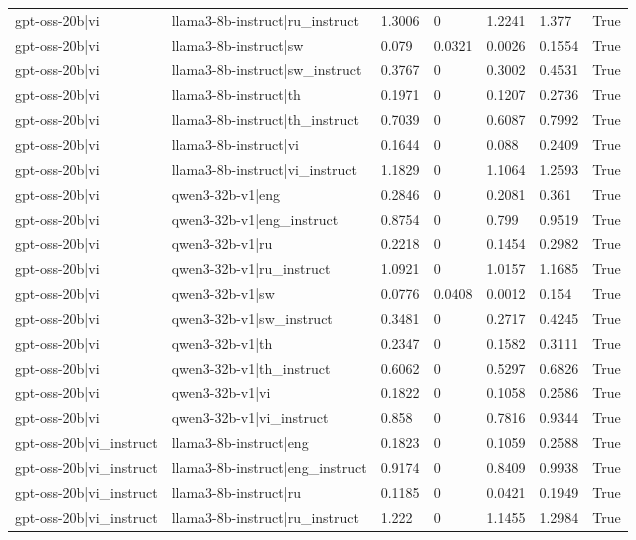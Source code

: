 \begin{table}
\begin{tabular}{llllllr}
gpt-oss-20b|vi & llama3-8b-instruct|ru_instruct & 1.3006 & 0 & 1.2241 & 1.377 & True \\
gpt-oss-20b|vi & llama3-8b-instruct|sw & 0.079 & 0.0321 & 0.0026 & 0.1554 & True \\
gpt-oss-20b|vi & llama3-8b-instruct|sw_instruct & 0.3767 & 0 & 0.3002 & 0.4531 & True \\
gpt-oss-20b|vi & llama3-8b-instruct|th & 0.1971 & 0 & 0.1207 & 0.2736 & True \\
gpt-oss-20b|vi & llama3-8b-instruct|th_instruct & 0.7039 & 0 & 0.6087 & 0.7992 & True \\
gpt-oss-20b|vi & llama3-8b-instruct|vi & 0.1644 & 0 & 0.088 & 0.2409 & True \\
gpt-oss-20b|vi & llama3-8b-instruct|vi_instruct & 1.1829 & 0 & 1.1064 & 1.2593 & True \\
gpt-oss-20b|vi & qwen3-32b-v1|eng & 0.2846 & 0 & 0.2081 & 0.361 & True \\
gpt-oss-20b|vi & qwen3-32b-v1|eng_instruct & 0.8754 & 0 & 0.799 & 0.9519 & True \\
gpt-oss-20b|vi & qwen3-32b-v1|ru & 0.2218 & 0 & 0.1454 & 0.2982 & True \\
gpt-oss-20b|vi & qwen3-32b-v1|ru_instruct & 1.0921 & 0 & 1.0157 & 1.1685 & True \\
gpt-oss-20b|vi & qwen3-32b-v1|sw & 0.0776 & 0.0408 & 0.0012 & 0.154 & True \\
gpt-oss-20b|vi & qwen3-32b-v1|sw_instruct & 0.3481 & 0 & 0.2717 & 0.4245 & True \\
gpt-oss-20b|vi & qwen3-32b-v1|th & 0.2347 & 0 & 0.1582 & 0.3111 & True \\
gpt-oss-20b|vi & qwen3-32b-v1|th_instruct & 0.6062 & 0 & 0.5297 & 0.6826 & True \\
gpt-oss-20b|vi & qwen3-32b-v1|vi & 0.1822 & 0 & 0.1058 & 0.2586 & True \\
gpt-oss-20b|vi & qwen3-32b-v1|vi_instruct & 0.858 & 0 & 0.7816 & 0.9344 & True \\
gpt-oss-20b|vi_instruct & llama3-8b-instruct|eng & 0.1823 & 0 & 0.1059 & 0.2588 & True \\
gpt-oss-20b|vi_instruct & llama3-8b-instruct|eng_instruct & 0.9174 & 0 & 0.8409 & 0.9938 & True \\
gpt-oss-20b|vi_instruct & llama3-8b-instruct|ru & 0.1185 & 0 & 0.0421 & 0.1949 & True \\
gpt-oss-20b|vi_instruct & llama3-8b-instruct|ru_instruct & 1.222 & 0 & 1.1455 & 1.2984 & True \\

\end{tabular}
\end{table}
